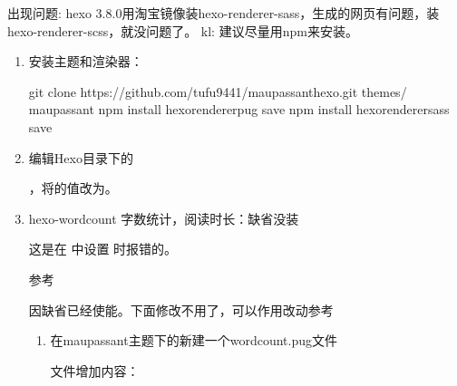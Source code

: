\documentclass[letterpaper,12pt,english]{sphinxmanual}
\begin{document}
出现问题: hexo 3.8.0用淘宝镜像装hexo-renderer-sass，生成的网页有问题，装hexo-renderer-scss，就没问题了。
kl: 建议尽量用npm来安装。
\begin{enumerate}
%
\item {} 
安装主题和渲染器：

\begin{sphinxVerbatim}[commandchars=\\\{\}]
\PYGZdl{} git clone https://github.com/tufu9441/maupassant\PYGZhy{}hexo.git themes/    maupassant
\PYGZdl{} npm install hexo\PYGZhy{}renderer\PYGZhy{}pug \PYGZhy{}\PYGZhy{}save
\PYGZdl{} npm install hexo\PYGZhy{}renderer\PYGZhy{}sass \PYGZhy{}\PYGZhy{}save
\end{sphinxVerbatim}

\item {} 
编辑Hexo目录下的

，将的值改为。

\item {} 
hexo-wordcount 字数统计，阅读时长：缺省没装

这是在  中设置  时报错的。

参考 


因缺省已经使能。下面修改不用了，可以作用改动参考
\begin{enumerate}
%
\item {} 
在maupassant主题下的新建一个wordcount.pug文件

 文件增加内容：


\end{enumerate}
\end{enumerate}
\end{document}
